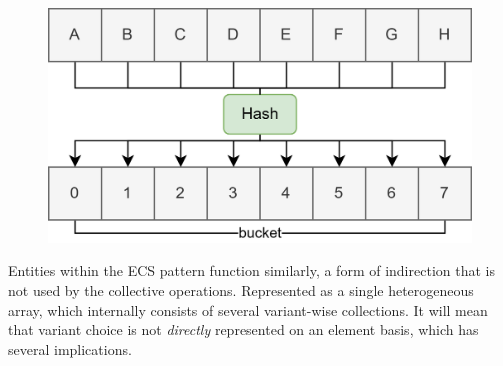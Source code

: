 \documentclass{article}
\begin{document}
\begin{figure}[ht]
    \centering
    \includegraphics[scale=0.1]{hashtable}
\end{figure}

Entities within the ECS pattern function similarly, a form of indirection that is not used by the collective operations. 
Represented as a single heterogeneous array, which internally consists of several variant-wise collections. 
It will mean that variant choice is not {\it directly} represented on an element basis, which has several implications.
\end{document}
